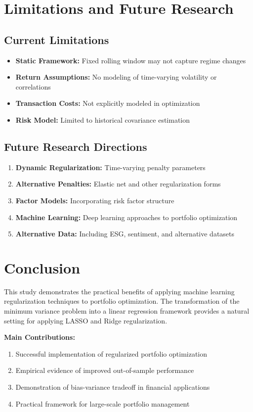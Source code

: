 \documentclass[12pt]{article}
\begin{document}
\section{Limitations and Future Research}

\subsection{Current Limitations}
\begin{itemize}
    \item \textbf{Static Framework:} Fixed rolling window may not capture regime changes
    \item \textbf{Return Assumptions:} No modeling of time-varying volatility or correlations
    \item \textbf{Transaction Costs:} Not explicitly modeled in optimization
    \item \textbf{Risk Model:} Limited to historical covariance estimation
\end{itemize}

\subsection{Future Research Directions}
\begin{enumerate}
    \item \textbf{Dynamic Regularization:} Time-varying penalty parameters
    \item \textbf{Alternative Penalties:} Elastic net and other regularization forms
    \item \textbf{Factor Models:} Incorporating risk factor structure
    \item \textbf{Machine Learning:} Deep learning approaches to portfolio optimization
    \item \textbf{Alternative Data:} Including ESG, sentiment, and alternative datasets
\end{enumerate}

\section{Conclusion}

This study demonstrates the practical benefits of applying machine learning regularization techniques to portfolio optimization. The transformation of the minimum variance problem into a linear regression framework provides a natural setting for applying LASSO and Ridge regularization.

\textbf{Main Contributions:}
\begin{enumerate}
    \item Successful implementation of regularized portfolio optimization
    \item Empirical evidence of improved out-of-sample performance
    \item Demonstration of bias-variance tradeoff in financial applications
    \item Practical framework for large-scale portfolio management
\end{enumerate}
\end{document}

